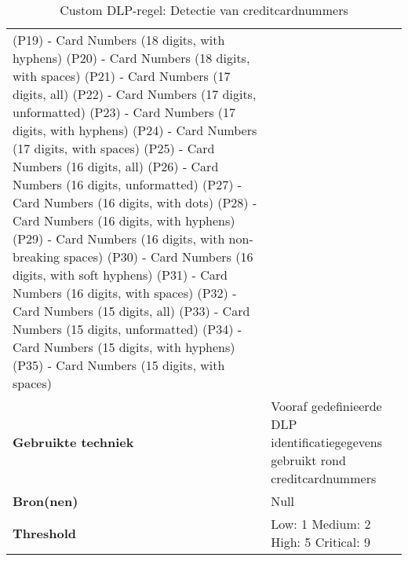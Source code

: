 \begin{table}[h]
\begin{tabular}{p{4cm} p{10cm}}
        (P19) \-- Card Numbers (18 digits, with hyphens) \newline
        (P20) \-- Card Numbers (18 digits, with spaces) \newline
        (P21) \-- Card Numbers (17 digits, all) \newline
        (P22) \-- Card Numbers (17 digits, unformatted) \newline
        (P23) \-- Card Numbers (17 digits, with hyphens) \newline
        (P24) \-- Card Numbers (17 digits, with spaces) \newline
        (P25) \-- Card Numbers (16 digits, all) \newline
        (P26) \-- Card Numbers (16 digits, unformatted) \newline
        (P27) \-- Card Numbers (16 digits, with dots) \newline
        (P28) \-- Card Numbers (16 digits, with hyphens) \newline
        (P29) \-- Card Numbers (16 digits, with non-breaking spaces) \newline
        (P30) \-- Card Numbers (16 digits, with soft hyphens) \newline
        (P31) \-- Card Numbers (16 digits, with spaces) \newline
        (P32) \-- Card Numbers (15 digits, all) \newline
        (P33) \-- Card Numbers (15 digits, unformatted) \newline
        (P34) \-- Card Numbers (15 digits, with hyphens) \newline
        (P35) \-- Card Numbers (15 digits, with spaces) \\
        \textbf{Gebruikte techniek} & Vooraf gedefinieerde DLP identificatiegegevens gebruikt rond creditcardnummers \\
        \textbf{Bron(nen)} & Null \\
        \textbf{Threshold} & Low: 1 \quad Medium: 2 \quad High: 5 \quad Critical: 9 \\
        \bottomrule
    \end{tabular}
    \caption{Custom DLP-regel: Detectie van creditcardnummers}
    \label{tab:custom-eu-card}
\end{table}


